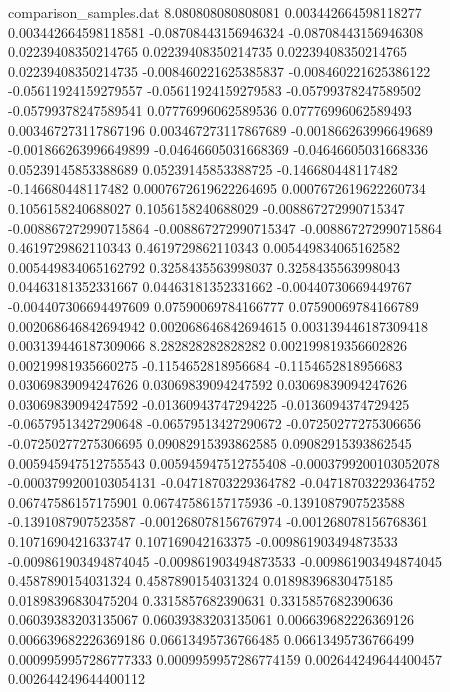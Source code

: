 \begin{filecontents}{comparison_samples.dat}
8.080808080808081   0.003442664598118277    0.003442664598118581    -0.08708443156946324   -0.08708443156946308   0.02239408350214765    0.02239408350214735    0.02239408350214765    0.02239408350214735    -0.008460221625385837  -0.008460221625386122  -0.05611924159279557    -0.05611924159279583    -0.05799378247589502   -0.05799378247589541   0.07776996062589536     0.07776996062589493     0.003467273117867196    0.003467273117867689    -0.001866263996649689   -0.001866263996649899   -0.04646605031668369    -0.04646605031668336    0.05239145853388689     0.05239145853388725     -0.146680448117482      -0.146680448117482      0.0007672619622264695  0.0007672619622260734  0.1056158240688027     0.1056158240688029     -0.008867272990715347   -0.008867272990715864   -0.008867272990715347   -0.008867272990715864   0.4619729862110343     0.4619729862110343     0.005449834065162582    0.005449834065162792    0.3258435563998037     0.3258435563998043     0.04463181352331667     0.04463181352331662     -0.00440730669449767    -0.004407306694497609   0.07590069784166777    0.07590069784166789    0.002068646842694942   0.002068646842694615   0.003139446187309418    0.003139446187309066  
8.282828282828282   0.002199819356602826    0.00219981935660275     -0.1154652818956684    -0.1154652818956683    0.03069839094247626    0.03069839094247592    0.03069839094247626    0.03069839094247592    -0.01360943747294225   -0.0136094374729425    -0.06579513427290648    -0.06579513427290672    -0.07250277275306656   -0.07250277275306695   0.09082915393862585     0.09082915393862545     0.005945947512755543    0.005945947512755408    -0.0003799200103052078  -0.0003799200103054131  -0.04718703229364782    -0.04718703229364752    0.06747586157175901     0.06747586157175936     -0.1391087907523588     -0.1391087907523587     -0.001268078156767974  -0.001268078156768361  0.1071690421633747     0.107169042163375      -0.009861903494873533   -0.009861903494874045   -0.009861903494873533   -0.009861903494874045   0.4587890154031324     0.4587890154031324     0.01898396830475185     0.01898396830475204     0.3315857682390631     0.3315857682390636     0.06039383203135067     0.06039383203135061     0.006639682226369126    0.006639682226369186    0.06613495736766485    0.06613495736766499    0.0009959957286777333  0.0009959957286774159  0.002644249644400457    0.002644249644400112  

\end{filecontents}
